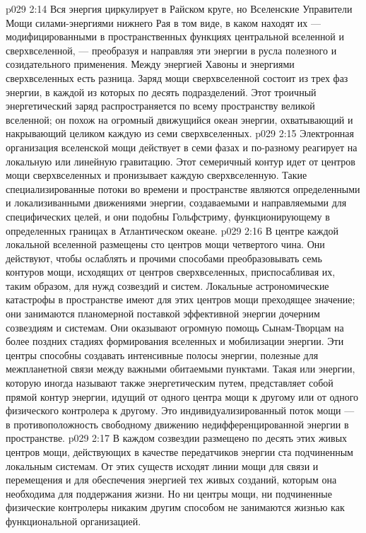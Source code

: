 \vs p029 2:14 Вся энергия циркулирует в Райском круге, но Вселенские Управители Мощи  силами\hyp{}энергиями нижнего Рая в том виде, в каком находят их --- модифицированными в пространственных функциях центральной вселенной и сверхвселенной, --- преобразуя и направляя эти энергии в русла полезного и созидательного применения. Между энергией Хавоны и энергиями сверхвселенных есть разница. Заряд мощи сверхвселенной состоит из трех фаз энергии, в каждой из которых по десять подразделений. Этот троичный энергетический заряд распространяется по всему пространству великой вселенной; он похож на огромный движущийся океан энергии, охватывающий и накрывающий целиком каждую из семи сверхвселенных.
\vs p029 2:15 Электронная организация вселенской мощи действует в семи фазах и по\hyp{}разному реагирует на локальную или линейную гравитацию. Этот семеричный контур идет от центров мощи сверхвселенных и пронизывает каждую сверхвселенную. Такие специализированные потоки во времени и пространстве являются определенными и локализиванными движениями энергии, создаваемыми и направляемыми для специфических целей, и они подобны Гольфстриму, функционирующему в определенных границах в Атлантическом океане.
\vs p029 2:16 \pc {}\bibnobreakspace {} В центре каждой локальной вселенной размещены сто центров мощи четвертого чина. Они действуют, чтобы ослаблять и прочими способами преобразовывать семь контуров мощи, исходящих от центров сверхвселенных, приспосабливая их, таким образом, для нужд созвездий и систем. Локальные астрономические катастрофы в пространстве имеют для этих центров мощи преходящее значение; они занимаются планомерной поставкой эффективной энергии дочерним созвездиям и системам. Они оказывают огромную помощь Сынам\hyp{}Творцам на более поздних стадиях формирования вселенных и мобилизации энергии. Эти центры способны создавать интенсивные полосы энергии, полезные для межпланетной связи между важными обитаемыми пунктами. Такая  или  энергии, которую иногда называют также энергетическим путем, представляет собой прямой контур энергии, идущий от одного центра мощи к другому или от одного физического контролера к другому. Это индивидуализированный поток мощи --- в противоположность свободному движению недифференцированной энергии в пространстве.
\vs p029 2:17 \pc {}\bibnobreakspace {} В каждом созвездии размещено по десять этих живых центров мощи, действующих в качестве передатчиков энергии ста подчиненным локальным системам. От этих существ исходят линии мощи для связи и перемещения и для обеспечения энергией тех живых созданий, которым она необходима для поддержания жизни. Но ни центры мощи, ни подчиненные физические контролеры никаким другим способом не занимаются жизнью как функциональной организацией.
